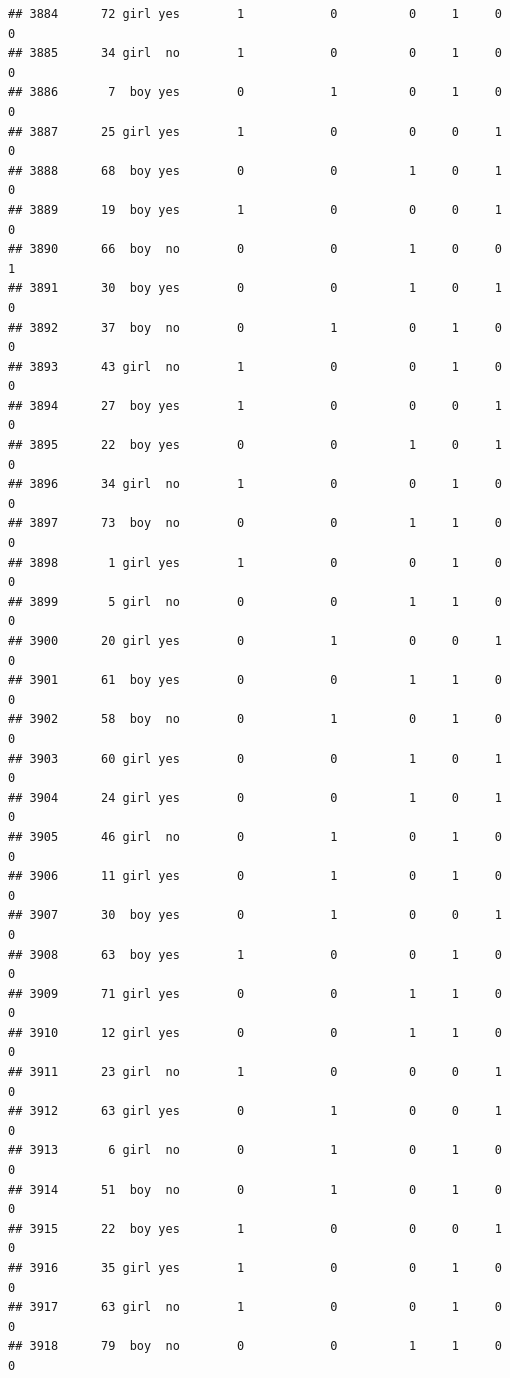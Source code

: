 \documentclass[man]{apa6}
\begin{document}
\begin{verbatim}
## 3884      72 girl yes        1            0          0     1     0     0
## 3885      34 girl  no        1            0          0     1     0     0
## 3886       7  boy yes        0            1          0     1     0     0
## 3887      25 girl yes        1            0          0     0     1     0
## 3888      68  boy yes        0            0          1     0     1     0
## 3889      19  boy yes        1            0          0     0     1     0
## 3890      66  boy  no        0            0          1     0     0     1
## 3891      30  boy yes        0            0          1     0     1     0
## 3892      37  boy  no        0            1          0     1     0     0
## 3893      43 girl  no        1            0          0     1     0     0
## 3894      27  boy yes        1            0          0     0     1     0
## 3895      22  boy yes        0            0          1     0     1     0
## 3896      34 girl  no        1            0          0     1     0     0
## 3897      73  boy  no        0            0          1     1     0     0
## 3898       1 girl yes        1            0          0     1     0     0
## 3899       5 girl  no        0            0          1     1     0     0
## 3900      20 girl yes        0            1          0     0     1     0
## 3901      61  boy yes        0            0          1     1     0     0
## 3902      58  boy  no        0            1          0     1     0     0
## 3903      60 girl yes        0            0          1     0     1     0
## 3904      24 girl yes        0            0          1     0     1     0
## 3905      46 girl  no        0            1          0     1     0     0
## 3906      11 girl yes        0            1          0     1     0     0
## 3907      30  boy yes        0            1          0     0     1     0
## 3908      63  boy yes        1            0          0     1     0     0
## 3909      71 girl yes        0            0          1     1     0     0
## 3910      12 girl yes        0            0          1     1     0     0
## 3911      23 girl  no        1            0          0     0     1     0
## 3912      63 girl yes        0            1          0     0     1     0
## 3913       6 girl  no        0            1          0     1     0     0
## 3914      51  boy  no        0            1          0     1     0     0
## 3915      22  boy yes        1            0          0     0     1     0
## 3916      35 girl yes        1            0          0     1     0     0
## 3917      63 girl  no        1            0          0     1     0     0
## 3918      79  boy  no        0            0          1     1     0     0

\end{verbatim}
\end{document}
